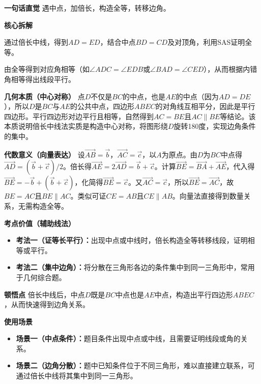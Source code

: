 \begin{explanationbox}
	\textbf{\textcolor{CExplanation}{一句话直觉}}
	遇中点，加倍长，构造全等，转移边角。

	\medskip
	\textbf{\textcolor{CExplanation}{核心拆解}}
	\begin{description}[style=nextline, leftmargin=2.8em, labelsep=0.5em, itemsep=0.45em]
		\item[\textbf{要点一（全等构造）：}]
			通过倍长中线，得到$AD=ED$，结合中点$BD=CD$及对顶角，利用SAS证明全等。
		\item[\textbf{要点二（平行得出）：}]
			由全等得到对应角相等（如$\angle ADC=\angle EDB$或$\angle BAD=\angle CED$），从而根据内错角相等得出线段平行。
	\end{description}

	\medskip
	\textbf{\textcolor{CExplanation}{几何本质（中心对称）}}
	点$D$不仅是$BC$的中点，也是$AE$的中点（因为$AD=DE$），所以$D$是$BC$与$AE$的公共中点，四边形$ABEC$的对角线互相平分，因此是平行四边形。平行四边形对边平行且相等，自然得到$AC=BE$且$AC\parallel BE$等结论。该本质说明倍长中线法实质是构造中心对称，将图形绕$D$旋转180度，实现边角条件的集中。

	\medskip
	\textbf{\textcolor{CExplanation}{代数意义（向量表达）}}
	设$\overrightarrow{AB}=\vec{b}$，$\overrightarrow{AC}=\vec{c}$，以$A$为原点。由$D$为$BC$中点得$\overrightarrow{AD}=(\vec{b}+\vec{c})/2$。倍长得$\overrightarrow{AE}=2\overrightarrow{AD}=\vec{b}+\vec{c}$。计算$\overrightarrow{BE}=\overrightarrow{BA}+\overrightarrow{AE}$，代入得$\overrightarrow{BE}=-\vec{b}+(\vec{b}+\vec{c})$，化简得$\overrightarrow{BE}=\vec{c}$。又$\overrightarrow{AC}=\vec{c}$，所以$\overrightarrow{BE}=\overrightarrow{AC}$，故$BE=AC$且$BE\parallel AC$。类似可证$CE=AB$且$CE\parallel AB$。向量法直接得到数量关系，无需构造全等。

	\medskip
	\textbf{\textcolor{CExplanation}{考点价值（辅助线法）}}
	\begin{itemize}[leftmargin=*, itemsep=0.5em, topsep=0.4em]
		\item \textbf{考法一（证等长平行）：}出现中点或中线时，倍长构造全等转移线段，证明相等或平行。
		\item \textbf{考法二（集中边角）：}将分散在三角形各边的条件集中到同一三角形中，常用于几何综合题。
	\end{itemize}

	\medskip
	\textbf{\textcolor{CExplanation}{顿悟点}}
	倍长中线后，中点$D$既是$BC$中点也是$AE$中点，构造出平行四边形$ABEC$，从而快速得到边角关系。

	\medskip
	\textbf{\textcolor{CExplanation}{使用场景}}
	\begin{itemize}[leftmargin=*, itemsep=0.5em, topsep=0.4em]
		\item \textbf{场景一（中点条件）：}题目条件出现中点或中线，且需要证明线段或角的关系。
		\item \textbf{场景二（边角分散）：}题中已知条件位于不同三角形，难以直接建立联系，可通过倍长中线将其集中到同一三角形。
	\end{itemize}

\end{explanationbox}
